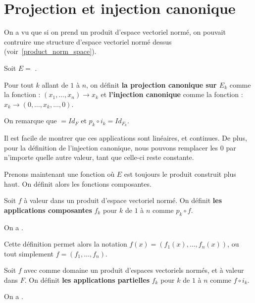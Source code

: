 \section{Projection et injection canonique}

On a vu que si on prend un produit d'espace vectoriel normé, on pouvait
contruire une structure d'espace vectoriel normé dessus (voir~\ref{product_norm_space}).


Soit $E = $ .
\begin{definition} 
\label{injection_projection_definition}
	Pour tout $k$ allant de $1$ à $n$, on définit \textbf{la projection
		canonique sur $E_{k}$} comme la fonction
		 : $(x_{1}, \ldots, x_{n}) \rightarrow
		x_{k}$ et \textbf{l'injection canonique}
		comme la fonction  : $x_{k}
		\rightarrow (0, \ldots, x_{k}, \ldots, 0)$.
\end{definition}

On remarque que  $ = Id_{F}$ et $p_{k} \circ
i_{k} = Id_{F_{k}}$.

Il est facile de montrer que ces applications sont linéaires, et continues.
De plus, pour la définition de l'injection canonique, nous pouvons remplacer les
$0$ par n'importe quelle autre valeur, tant que celle-ci reste constante.

Prenons maintenant une fonction  où $E$ est toujours
le produit construit plus haut.
On définit alors les fonctions composantes.

\begin{definition} 
\label{composante_function}
	Soit $f$ à valeur dans un produit d'espace vectoriel normé. On définit
	\textbf{les applications composantes} $f_{k}$ pour $k$ de $1$ à $n$ comme
	$p_{k} \circ f$.

	On a .
\end{definition}

Cette définition permet alors la notation $f(x) = (f_{1}(x), \ldots, f_{n}(x))$,
ou tout simplement $f = (f_{1}, \ldots, f_{n})$.

\begin{definition} 
\label{partial_application}
	Soit $f$ avec comme domaine un produit d'espaces vectoriels
	 normés, et à valeur dans $F$. On définit
	\textbf{les applications partielles} $f_{k}$ pour $k$ de $1$ à $n$ comme $f
	\circ i_{k}$.

	On a .
\end{definition}

